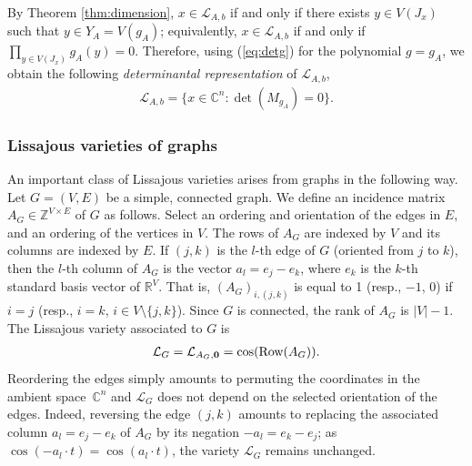 \documentclass[a4paper, 11pt, twoside]{article}
\newcommand{\C}{\mathbb{C}}
\newcommand{\Row}{{\text{\rm Row}}}
\newcommand{\ML}{{\mathcal L}}
\theoremstyle{plain}
\begin{document}
By Theorem \ref{thm:dimension}, $x\in\ML_{A,b}$ if and only if there exists $y\in V(J_x)$ such that $y\in Y_{A}=V(g_A)$; equivalently, $x\in\ML_{A,b}$ if and only if $\prod_{y \in V(J_x)}g_A(y)=0$. Therefore, using (\ref{eq:detg}) for the polynomial $g = g_A$, we obtain the following {\em determinantal representation} of $\ML_{A,b}$,
\begin{align}\label{eq:detrep}
\ML_{A,b}=\{x\in\C^n: \det(M_{g_A})=0\}.
\end{align}




\subsubsection*{Lissajous varieties of graphs}
An important class of Lissajous varieties arises from graphs in the following way.
 Let $G=(V,E)$ be a simple, connected graph. 
 We define an {incidence matrix} $A_G\in \mathbb{Z}^{V\times E}$ of $G$ as follows. Select an ordering and orientation of the edges in  $E$, and an ordering of the vertices in $V$. The rows of $A_G$ are indexed by $V$ and its columns are indexed by $E$.
If $(j,k)$ is the $l$-th edge of $G$ (oriented from $j$ to $k$),
  then the $l$-th column of $A_G$ is the vector $a_l = e_j-e_k$, where $e_k$ is the $k$-th standard basis vector of $\mathbb{R}^V$.
That is, $(A_G)_{i,(j,k)}$ is equal to 1 (resp., $-1$, 0) if $i=j$ (resp., $i=k$, $i\in V\setminus\{j,k\}$).
 Since $G$ is connected, the rank of $A_G$ is $|V|-1$. 
The  Lissajous variety associated to $G$  
is
\begin{align*}
   \ML_G  
  =\ML_{A_G,{\bf 0}}=\cos (\Row(A_G)).
\end{align*}
Reordering the edges simply amounts to permuting the coordinates in the ambient space~$\mathbb{C}^n$ and  $\mathcal L_{G}$ does not depend on the selected orientation of the edges. Indeed, reversing the edge $(j,k)$ amounts to replacing the associated column $a_l=e_j-e_k$ of $A_G$ by its negation  $-a_l=e_k-e_j$; as $\cos(-a_l\cdot t)=\cos(a_l\cdot t)$, the variety $\mathcal L_{G}$ remains unchanged. 
 
\end{document}
